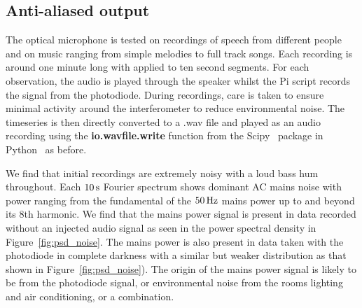 \documentclass[paper-main.tex]{subfiles}
\begin{document}
\subsection{Anti-aliased output}
\label{sec:initialResultsOpMic}
The optical microphone is tested on recordings of speech from different people and on music ranging from simple melodies to full track songs. 
Each recording is around one minute long with  applied to ten second segments. 
For each observation, the audio is played through the speaker whilst the Pi script records the signal from the photodiode. 
During recordings, care is taken to ensure minimal activity around the interferometer to reduce environmental noise. 
The timeseries is then directly converted to a .wav file and played as an audio recording using the \textbf{io.wavfile.write} function from the Scipy~\cite{scipy} package in Python~\cite{python} as before.

We find that initial recordings  are extremely noisy with a loud bass hum throughout.
Each $10\,{\rm s}$ Fourier spectrum shows dominant AC mains noise with power ranging from the fundamental of the $50\,{\rm Hz}$ mains power up to and beyond its $8$th harmonic. 
We find that the mains power signal is present in data recorded without an injected audio signal as seen in the power spectral density in Figure~\ref{fig:psd_noise}.
The mains power is also present in data taken with the photodiode in complete darkness with a similar but weaker distribution as that shown in Figure~\ref{fig:psd_noise}).
The origin of the mains power signal is likely to be from the photodiode signal, or environmental noise from the rooms lighting and air conditioning, or a combination. 
\end{document}
